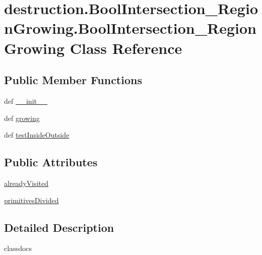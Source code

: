 \hypertarget{classdestruction_1_1_bool_intersection___region_growing_1_1_bool_intersection___region_growing}{\section{destruction.\-Bool\-Intersection\-\_\-\-Region\-Growing.\-Bool\-Intersection\-\_\-\-Region\-Growing Class Reference}
\label{classdestruction_1_1_bool_intersection___region_growing_1_1_bool_intersection___region_growing}
}
\subsection*{Public Member Functions}
\begin{DoxyCompactItemize}
\item 
def \hyperlink{classdestruction_1_1_bool_intersection___region_growing_1_1_bool_intersection___region_growing_a7ea22ea56e4d80f814e7e0a7ab760292}{\-\_\-\-\_\-init\-\_\-\-\_\-}
\item 
def \hyperlink{classdestruction_1_1_bool_intersection___region_growing_1_1_bool_intersection___region_growing_a664308f7ec02d26d883c8fe8a88d2eb9}{growing}
\item 
def \hyperlink{classdestruction_1_1_bool_intersection___region_growing_1_1_bool_intersection___region_growing_ac9ed822dacd5f6681e3a137bade71be4}{test\-Inside\-Outside}
\end{DoxyCompactItemize}
\subsection*{Public Attributes}
\begin{DoxyCompactItemize}
\item 
\hyperlink{classdestruction_1_1_bool_intersection___region_growing_1_1_bool_intersection___region_growing_af6985d0ce9dd0403c9a608408bdfacf8}{already\-Visited}
\item 
\hyperlink{classdestruction_1_1_bool_intersection___region_growing_1_1_bool_intersection___region_growing_ae352e3b42a1b8933e9e52f82ea26628a}{primitives\-Divided}
\end{DoxyCompactItemize}


\subsection{Detailed Description}
\begin{DoxyVerb}classdocs
\end{DoxyVerb}
 

